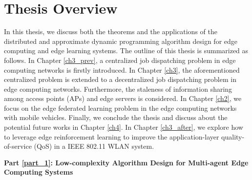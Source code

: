



\section{Thesis Overview}
In this thesis, we discuss both the theorems and the applications of the distributed and approximate dynamic programming algorithm design for edge computing and edge learning systems.
The outline of this thesis is summarized as follows.
In Chapter \ref{ch3_prev}, a centralized job dispatching problem in edge computing networks is firstly introduced.
In Chapter \ref{ch3}, the aforementioned centralized problem is extended to a decentralized job dispatching problem in edge computing networks. Furthermore, the staleness of information sharing among access points (APs) and edge servers is considered.
In Chapter \ref{ch2}, we focus on the edge federated learning problem in the edge computing networks with mobile vehicles.
Finally, we conclude the thesis and discuss about the potential future works in Chapter \ref{ch4}.
In Chapter \ref{ch3_after}, we explore how to leverage edge reinforcement learning to improve the application-layer quality-of-service (QoS) in a IEEE 802.11 WLAN system.
%

\indent\textbf{Part \ref{part_1}: Low-complexity Algorithm Design for Multi-agent Edge Computing Systems}

